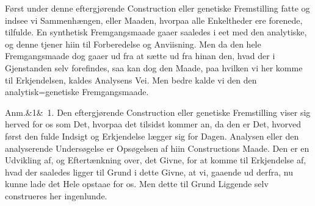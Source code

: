 \documentclass[12pt]{book}
\def\sperr#1{#1}%
\def\textit#1{#1}%
\def\emph#1{#1}%
\newcommand{\sperr}[1]{\textls[180]{#1}}
\newcommand{\anm}[1]{%
  \par\vspace{0.5\baselineskip}%
  \noindent\hspace{\parindent}\sperr{Anm.}\ifx&#1&\else~\textit{#1}.\fi
  \enspace\ignorespaces
}
\newcommand{\opage}[1]{\marginnote{\footnotesize\textit{[#1]}}}
\begin{document}
Først under denne \emph{eftergjørende Construction eller genetiske
Fremstilling} fatte og indsee vi Sammenhængen, eller Maaden, hvorpaa alle
Enkeltheder ere forenede, tilfulde. En \emph{synthetisk Fremgangsmaade} gaaer
saaledes i eet med den \emph{analytiske}, og denne tjener hiin til Forberedelse
og Anviisning. Men da den hele Fremgangsmaade dog gaaer ud fra at sætte ud fra
hinan%
\opage{57}den, hvad der i Gjenstanden selv forefindes, saa kan dog den Maade, paa hvilken
vi her komme til Erkjendelsen, kaldes \emph{Analysens Vei}. Men bedre kalde vi
den den \emph{analytisk=genetiske Fremgangsmaade}.

\anm{1} Den eftergjørende Construction eller genetiske Fremstilling viser sig
herved for os som Det, hvorpaa det tilsidst kommer an, da den er Det, hvorved
først den fulde Indsigt og Erkjendelse lægger sig for Dagen. Analysen eller den
analyserende Undersøgelse er Opsøgelsen af hiin Constructions Maade. Den er en
Udvikling af, og Eftertænkning over, det Givne, for at komme til Erkjendelse
af, hvad der saaledes ligger til Grund i dette Givne, at vi, gaaende ud derfra,
nu kunne lade det Hele opstaae for os. Men dette \emph{til Grund Liggende} selv
construeres her ingenlunde.
\end{document}
